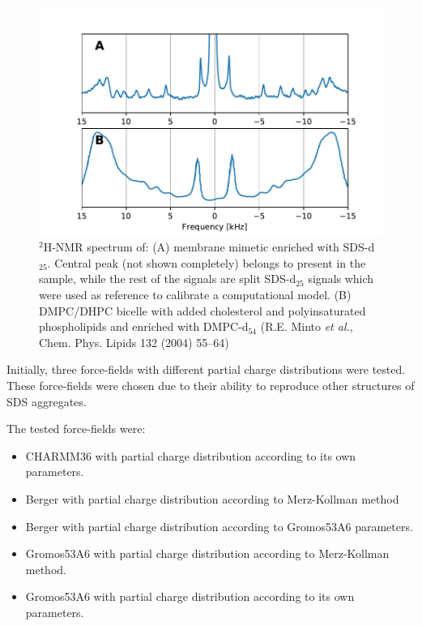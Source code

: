 \documentclass[3p,preprint,review]{elsarticle}
\begin{document}
	\begin{figure}[h]
		\centering
		\includegraphics[width=\columnwidth]{nmr_reference.pdf}
		\caption{$^2$H-NMR spectrum of: (A) membrane mimetic enriched with SDS-d$_{25}$.
			Central peak (not shown completely) belongs to  present in the
			sample, while the rest of the signals are split SDS-d$_{25}$ signals which
			were used as reference to calibrate a computational model. (B) DMPC/DHPC bicelle with added cholesterol and polyinsaturated phospholipids and enriched with DMPC-d$_{54}$ (R.E. Minto \textit{et al.}, Chem. Phys. Lipids 132 (2004) 55–64)}
		\label{fig:reference}
	\end{figure}
	Initially,
	three force-fields with different partial charge distributions were tested.
	These force-fields were chosen due to their ability to reproduce other
	structures of
	SDS aggregates\cite{Tang2014}.\par
	The tested force-fields were:
	\begin{itemize}
		\item CHARMM36\cite{Vanommeslaeghe2009} with partial charge distribution according to its own parameters.
		\item Berger\cite{Berger1997} with partial charge distribution according to
		Merz-Kollman
		method\cite{Besler1990}
		\item Berger with partial charge distribution according to
		Gromos53A6\cite{Oostenbrink2004}
		parameters.
		\item Gromos53A6 with partial charge distribution according to Merz-Kollman
		method.
		\item Gromos53A6 with partial charge distribution according to its own
		parameters.
	\end{itemize}
	
\end{document}
